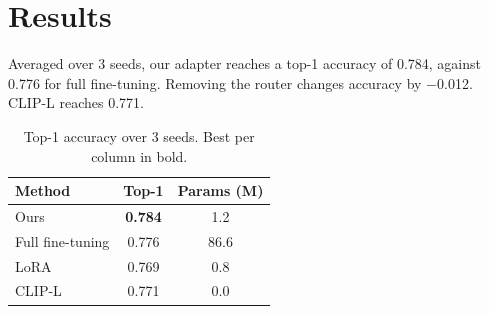\documentclass{article}
\begin{document}
\begin{abstract}
We present a sparse mixture adapter for vision transformers. It reaches 78.4\% top-1 accuracy on the
held-out split and is the best method on 4 of 5 benchmarks.
\end{abstract}

\section{Results}
Averaged over 3 seeds, our adapter reaches a top-1 accuracy of 0.784, against 0.776 for full fine-tuning.
Removing the router changes accuracy by $-$0.012. CLIP-L reaches 0.771.

\begin{table}[h]
\centering
\caption{Top-1 accuracy over 3 seeds. Best per column in bold.}
\begin{tabular}{lcc}
\toprule
Method & Top-1 & Params (M) \\
\midrule
Ours & \textbf{0.784} & 1.2 \\
Full fine-tuning & 0.776 & 86.6 \\
LoRA & 0.769 & 0.8 \\
CLIP-L & 0.771 & 0.0 \\
\bottomrule
\end{tabular}
\end{table}
\end{document}
